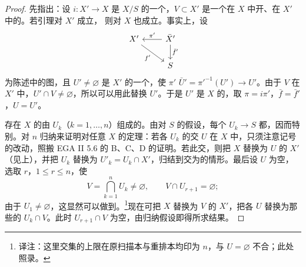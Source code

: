 \begin{proof}
先指出：设 $i:X'\to X$ 是 $X/S$ 的一个，$V\subset X'$ 是一个在 $X$ 中开、在 $X'$ 中的。若引理对 $X'$ 成立，
则对 $X$ 也成立。事实上，设
\[
\begin{tikzcd}
X'\arrow[dr,"f'"']&\bar X'\arrow[l,"\pi'"']\arrow[d,"\bar f'"]\\
&S
\end{tikzcd}
\]
为陈述中的图，且 $U'\neq\varnothing$ 是 $X'$ 的一个，使 $\pi'$  $\bar U'=\pi'^{-1}(U')\to U'$。由于 $V$ 在 $X'$ 中，$U'\cap V\neq\varnothing$，所以可以用此替换 $U'$。于是 $U'$ 是 $X$ 的，取 $\pi=i\pi'$，$\bar f=\bar f'$，$U=U'$。

存在 $X$ 的由 $U_k$（$k=1,\ldots,n$）组成的。由对 $S$ 的假设，每个 $U_k\to S$ 都，因而特别。对 $n$ 归纳来证明对任意 $X$ 的定理：若各 $U_k$ 的交 $U$ 在 $X$ 中，只须注意记号的改动，照搬 EGA II 5.6 的 B、C、D 的证明。若此交，则把 $X$ 替换为 $U$ 的 $X'$（见上），并把 $U_k$ 替换为 $U'_k=U_k\cap X'$，归结到交为的情形。最后设 $U$ 为空，选取 $r$，$1\leq r\leq n$，使
\[
V=\bigcap_{k=1}^{n}U_k\neq\varnothing,\qquad V\cap U_{r+1}=\varnothing;
\]
由于 $U_1\neq\varnothing$，这显然可以做到。\footnote{译注：这里交集的上限在原扫描本与重排本均印为 $n$，与 $U=\varnothing$ 不合；此处照录。}现在可把 $X$ 替换为 $V$ 的 $X'$，把各 $U$ 替换为那些的 $U_k\cap V$。此时 $U_{r+1}\cap V$ 为空，由归纳假设即得所求结果。
\end{proof}

